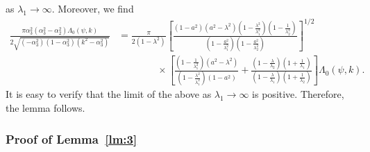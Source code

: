\documentclass[11pt]{amsart}
\numberwithin{equation}{section}
\numberwithin{figure}{section}
\theoremstyle{plain} %
\theoremstyle{definition} %
\begin{document}
as $\lambda_1\to\infty$.
Moreover, we find 
\begin{align*}
\frac{\pi\alpha_3^2(\alpha_3^2-\alpha_2^2)\Lambda_0 (\psi,k)}{2\sqrt{(-\alpha_3^2) (1-\alpha_3^2)(k^2-\alpha_3^2)}}
& =\frac{\pi}{2(1-\lambda^2)} \left[\frac{(1-a^2)(a^2-\lambda^2)(1-\frac{\lambda^2}{\lambda_1^2})(1-\frac{1}{\lambda_2^2})}{(1-\frac{a^2}{\lambda_1^2})(1-\frac{a^2}{\lambda_2^2})}\right]^{1/2} \\
& \qquad \qquad \times \left[ \frac{(1-\frac{1}{\lambda_1^2})(a^2-\lambda^2)}{(1-\frac{\lambda^2}{\lambda_1^2})(1-a^2)}+\frac{(1-\frac{\lambda}{\lambda_2})(1+\frac{1}{\lambda_1})}{(1-\frac{\lambda}{\lambda_1})(1+\frac{1}{\lambda_2})}  \right] \Lambda_0 (\psi,k). 
\end{align*}
It is easy to verify that the limit of the above as $\lambda_1\to\infty$ is positive. 
Therefore, the lemma follows.  

\subsubsection{Proof of Lemma~\ref{lm:3}} %
\end{document}
